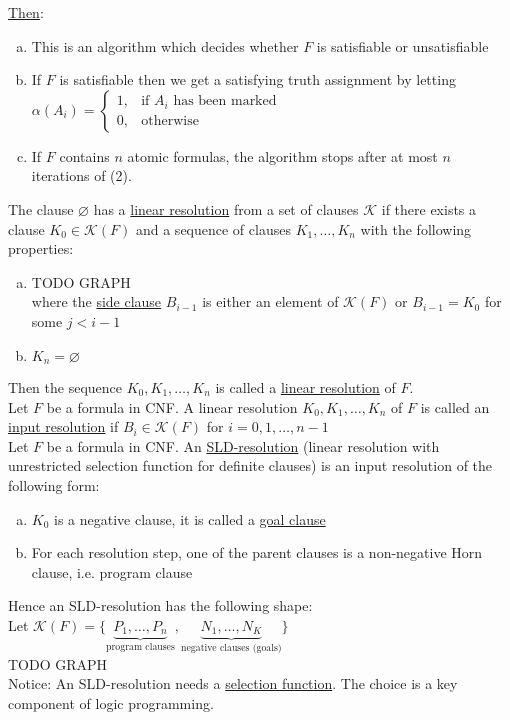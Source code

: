 \documentclass[a4paper]{article}
\newcommand{\ul}{\underline}
\begin{document}
\ul{Then}:
\begin{enumerate}[(a)]
	\item This is an algorithm which decides whether $F$ is satisfiable or unsatisfiable
	\item If $F$ is satisfiable then we get a satisfying truth assignment by letting $\alpha(A_i)=\begin{cases}
	1, & \text{if }A_i\text{ has been marked}\\
	0, & \text{otherwise}
	\end{cases}$
	\item If $F$ contains $n$ atomic formulas, the algorithm stops after at most $n$ iterations of (2).
\end{enumerate}
The clause $\varnothing$ has a \ul{linear resolution} from a set of clauses $\mathcal{K}$ if there exists a clause $K_0\in\mathcal{K}(F)$ and a sequence of clauses $K_1,\dots,K_n$ with the following properties:
\begin{enumerate}[(a)]
	\item TODO GRAPH\\
	where the \ul{side clause} $B_{i-1}$ is either an element of $\mathcal{K}(F)$ or $B_{i-1}=K_0$ for some $j<i-1$
	\item $K_n=\varnothing$
\end{enumerate}
Then the sequence $K_0,K_1,\dots,K_n$ is called a \ul{linear resolution} of $F$.\\
Let $F$ be a formula in CNF. A linear resolution $K_0,K_1,\dots,K_n$ of $F$ is called an \ul{input resolution} if $B_i\in\mathcal{K}(F)$ for $i=0,1,\dots,n-1$\\
Let $F$ be a formula in CNF. An \ul{SLD-resolution} (linear resolution with unrestricted selection function for definite clauses) is an input resolution of the following form:
\begin{enumerate}[(a)]
	\item $K_0$ is a negative clause, it is called a \ul{goal clause}
	\item For each resolution step, one of the parent clauses is a non-negative Horn clause, i.e. program clause
\end{enumerate}
Hence an SLD-resolution has the following shape:\\
Let $\mathcal{K}(F)=\{\underbrace{P_1,\dots,P_n}_{\text{program clauses}},\underbrace{N_1,\dots,N_K}_{\text{negative clauses (goals)}}\}$\\
TODO GRAPH\\
Notice: An SLD-resolution needs a \ul{selection function}. The choice is a key component of logic programming.
\end{document}
